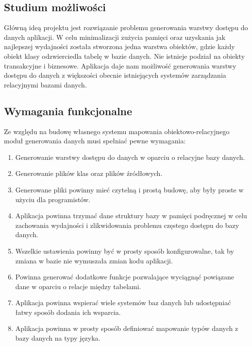 \documentclass[12pt]{report}
\begin{document}
\subsection{Studium możliwości}
	\indent Główną ideą projektu jest rozwiązanie problemu generowania warstwy dostępu do danych aplikacji. W celu minimalizacji zużycia pamięci oraz uzyskania jak najlepszej wydajności została stworzona jedna warstwa obiektów, gdzie każdy obiekt klasy odzwierciedla tabelę w bazie danych. Nie istnieje podział na obiekty transakcyjne i biznesowe. Aplikacja daje nam możliwość generowania warstwy dostępu do danych z większości obecnie istniejących systemów zarządzania relacyjnymi bazami danych.
\subsection{Wymagania funkcjonalne}
	\indent Ze względu na budowę własnego systemu mapowania obiektowo-relacyjnego moduł generowania danych musi spełniać pewne wymagania:
	\begin{enumerate}
	\item{Generowanie warstwy dostępu do danych w oparciu o relacyjne bazy danych.}
	\item{Generowanie plików klas oraz plików źródłowych.}
	\item{Generowane pliki powinny mieć czytelną i prostą budowę, aby były proste w użyciu dla programistów.}
	\item{Aplikacja powinna trzymać dane struktury bazy w pamięci podręcznej w celu zachowania wydajności i zlikwidowania problemu częstego dostępu do bazy danych.}
	\item{Wszelkie ustawienia powinny być w prosty sposób konfigurowalne, tak by zmiana w bazie nie wymuszała zmian kodu aplikacji.}
	\item{Powinna generować dodatkowe funkcje pozwalające wyciągnąć powiązane dane w oparciu o relacje między tabelami.}
	\item{Aplikacja powinna wspierać wiele systemów baz danych lub udostępniać łatwy sposób dodania ich wsparcia.}
	\item{Aplikacja powinna w prosty sposób definiować mapowanie typów danych z bazy danych na typy języka.}
	\end{enumerate}
\end{document}
